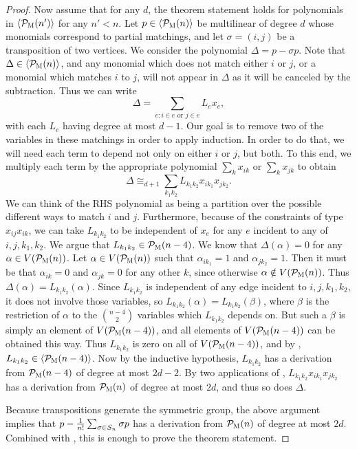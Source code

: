 \begin{proof}
Now assume that for any $d$, the theorem statement holds for polynomials in $\langle \mathcal P_{\textsc{M}}(n') \rangle$ for any $n' < n$. 
Let $p \in \langle \mathcal P_{\textsc{M}}(n) \rangle$ be multilinear of degree $d$ whose monomials correspond to partial matchings, and let $\sigma = (i,j)$ be a transposition of two vertices.
We consider the polynomial $\Delta = p - \sigma p$. Note that $\Delta \in \langle \mathcal P_{\textsc{M}}(n) \rangle$, and any monomial which does not match either $i$ or $j$, or a monomial which matches $i$ to $j$, will not appear in $\Delta$ as it will be canceled by the subtraction.
Thus we can write
\[\Delta = \sum_{e: i \in e \text{ or } j \in e} L_e x_e,\]
with each $L_e$ having degree at most $d-1$. Our goal is to remove two of the variables in these matchings in order to apply induction. In order to do that, we will need each term to depend not only on either $i$ or $j$, but both. To this end, we multiply each term by the appropriate polynomial $\sum_k x_{ik}$ or $\sum_k x_{jk}$ to obtain
\[\Delta \cong_{d+1} \sum_{k_1k_2} L_{k_1k_2} x_{ik_1}x_{jk_2}.\]
We can think of the RHS polynomial as being a partition over the possible different ways to match $i$ and $j$.
Furthermore, because of the constraints of type $x_{ij}x_{ik}$, we can take $L_{k_1k_2}$ to be independent of $x_e$ for any $e$ incident to any of $i,j,k_1,k_2$. 
We argue that $L_{k_1k_2} \in \mathcal P_{\textsc{M}}(n-4)$. We know that $\Delta(\alpha) = 0$ for any $\alpha \in V(\mathcal P_{\textsc{M}}(n))$. Let $\alpha \in V(\mathcal P_{\textsc{M}}(n))$ such that $\alpha_{ik_1} = 1$ and $\alpha_{jk_2} = 1$. 
Then it must be that $\alpha_{ik} = 0$ and $\alpha_{jk} = 0$ for any other $k$, since otherwise $\alpha \notin V(\mathcal P_{\textsc{M}}(n))$.
Thus $\Delta(\alpha) = L_{k_1k_2}(\alpha)$. Since $L_{k_1k_2}$ is independent of any edge incident to $i,j,k_1,k_2$, it does not involve those variables, so $L_{k_1k_2}(\alpha) = L_{k_1k_2}(\beta)$, where $\beta$ is the restriction of $\alpha$ to the $\binom{n-4}{2}$ variables which $L_{k_1k_2}$ depends on. But such a $\beta$ is simply an element of $V(\mathcal P_{\textsc{M}}(n-4))$, and all elements of $V(\mathcal P_{\textsc{M}}(n-4))$ can be obtained this way. Thus $L_{k_1k_2}$ is zero on all of $V(\mathcal P_{\textsc{M}}(n-4))$, and by , $L_{k_1k_2} \in \langle \mathcal P_{\textsc{M}}(n-4) \rangle$. Now by the inductive hypothesis, $L_{k_1k_2}$ has a derivation from $\mathcal P_{\textsc{M}}(n-4)$ of degree at most $2d-2$. By two applications of , $L_{k_1k_2}x_{ik_1}x_{jk_2}$ has a derivation from $\mathcal P_{\textsc{M}}(n)$ of degree at most $2d$, and thus so does $\Delta$.

Because transpositions generate the symmetric group, the above argument implies that $p - \frac{1}{n!}\sum_{\sigma \in S_{n}} \sigma p$ has a derivation from $\mathcal P_{\textsc{M}}(n)$ of degree at most $2d$. Combined with , this is enough to prove the theorem statement. 
\end{proof}

